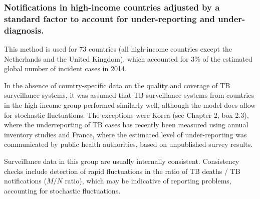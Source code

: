 \subsubsection {Notifications in high-income countries adjusted by a standard factor to account for under-reporting and under-diagnosis.} This method is used for 73 countries (all high-income countries except the Netherlands and the United Kingdom), which accounted for 3\% of the estimated global number of incident cases in 2014.

In the absence of country-specific data on the quality and coverage of TB surveillance systems, it was assumed that TB surveillance systems from countries in the high-income group performed similarly well, although the model does allow for stochastic fluctuations. The exceptions were Korea (see Chapter 2, box 2.3), where the underreporting of TB cases has recently been measured using annual inventory studies and France, where the estimated level of under-reporting was communicated by public health authorities, based on unpublished survey results.

Surveillance data in this group are usually internally consistent. Consistency checks include detection of rapid fluctuations in the ratio of TB deaths / TB notifications ($M/N$ ratio), which may be indicative of reporting problems, accounting for stochastic fluctuations.



